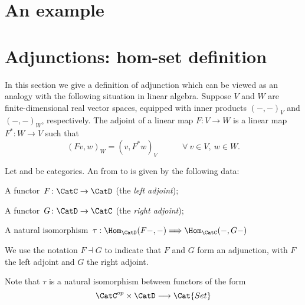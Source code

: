 
\section{An example}






\section{Adjunctions: hom-set definition}

In this section we give a definition of adjunction which can be viewed as an analogy with the following situation in linear algebra. Suppose $V$ and $W$ are finite-dimensional real vector spaces, equipped with inner products $(-, -)_V$ and $(-, -)_W$, respectively. The adjoint of a linear map $F: V \rightarrow W$ is a linear map $F^*: W \rightarrow V$ such that 
$$
(Fv, w)_W = (v, F^*w)_V \quad \quad \quad \forall \ v \in V, \ w \in W. 
$$




\begin{ctdefinition}\label{def-adj-iso}
  \label{def:cat-adjunction}
  Let \CatC and \CatD be categories. An \emph{} from \CatC to \CatD is given by the following data:
  \begin{compactenum}
    \item A functor~$F\colon \CatC \to \CatD$ (the \emph{left adjoint});
    \item A functor~$G\colon \CatD \to \CatC$ (the \emph{right adjoint});
    \item A natural isomorphism~$\tau : \Hom_{\CatD}(F - , - ) \Longrightarrow \Hom_{\CatC}(- , G - )$
  \end{compactenum}
  We use the notation $F \dashv G$ to indicate that $F$ and $G$ form an adjunction, with $F$ the left adjoint and $G$ the right adjoint. 
\end{ctdefinition}

\begin{remark}
Note that $\tau$ is a natural isomorphism between functors of the form
$$
\CatC^{op} \times \CatD \longrightarrow \Cat{Set}
$$
\end{remark}



